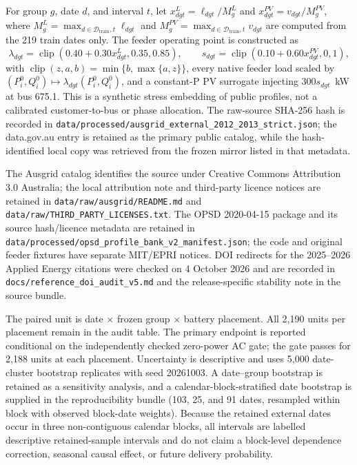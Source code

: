 \documentclass[11pt]{article}
\begin{document}
For group $g$, date $d$, and interval $t$, let $x^L_{dgt}=\ell_{dgt}/M^L_g$ and $x^{PV}_{dgt}=v_{dgt}/M^{PV}_g$, where $M^L_g=\max_{d\in\mathcal D_{\mathrm{train}},t}\ell_{dgt}$ and $M^{PV}_g=\max_{d\in\mathcal D_{\mathrm{train}},t}v_{dgt}$ are computed from the 219 train dates only. The feeder operating point is constructed as
\begin{equation}
\lambda_{dgt}=\operatorname{clip}(0.40+0.30x^L_{dgt},0.35,0.85),\qquad
s_{dgt}=\operatorname{clip}(0.10+0.60x^{PV}_{dgt},0,1),
\end{equation}
with $\operatorname{clip}(z,a,b)=\min\{b,\max\{a,z\}\}$, every native feeder load scaled by $(P^0_i,Q^0_i)\mapsto\lambda_{dgt}(P^0_i,Q^0_i)$, and a constant-P PV surrogate injecting $300s_{dgt}$~kW at bus 675.1. This is a synthetic stress embedding of public profiles, not a calibrated customer-to-bus or phase allocation. The raw-source SHA-256 hash is recorded in \texttt{data/processed/ausgrid\_external\_2012\_2013\_strict.json}; the data.gov.au entry is retained as the primary public catalog, while the hash-identified local copy was retrieved from the frozen mirror listed in that metadata.

The Ausgrid catalog identifies the source under Creative Commons Attribution 3.0 Australia; the local attribution note and third-party licence notices are retained in \texttt{data/raw/ausgrid/README.md} and \texttt{data/raw/THIRD\_PARTY\_LICENSES.txt}. The OPSD 2020-04-15 package and its source hash/licence metadata are retained in \texttt{data/processed/opsd\_profile\_bank\_v2\_manifest.json}; the code and original feeder fixtures have separate MIT/EPRI notices. DOI redirects for the 2025--2026 Applied Energy citations were checked on 4 October 2026 and are recorded in \texttt{docs/reference\_doi\_audit\_v5.md} and the release-specific stability note in the source bundle.

The paired unit is date $\times$ frozen group $\times$ battery placement. All 2,190 units per placement remain in the audit table. The primary endpoint is reported conditional on the independently checked zero-power AC gate; the gate passes for 2,188 units at each placement. Uncertainty is descriptive and uses 5,000 date-cluster bootstrap replicates with seed 20261003. A date--group bootstrap is retained as a sensitivity analysis, and a calendar-block-stratified date bootstrap is supplied in the reproducibility bundle (103, 25, and 91 dates, resampled within block with observed block-date weights). Because the retained external dates occur in three non-contiguous calendar blocks, all intervals are labelled descriptive retained-sample intervals and do not claim a block-level dependence correction, seasonal causal effect, or future delivery probability.
\end{document}

